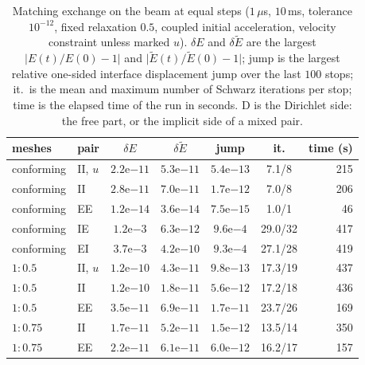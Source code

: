 \documentclass[11pt]{article}
\begin{document}
\begin{table}[htbp]
\centering
\footnotesize\setlength{\tabcolsep}{3pt}
\caption{Matching exchange on the beam at equal steps ($1\,\mu$s,
$10$\,ms, tolerance $10^{-12}$, fixed relaxation $0.5$, coupled initial
acceleration, velocity constraint unless marked $u$). $\delta E$ and
$\delta\tilde{E}$ are the largest $\lvert E(t)/E(0) - 1\rvert$ and
$\lvert \tilde{E}(t)/\tilde{E}(0) - 1\rvert$; jump is the largest relative
one-sided interface displacement jump over the last $100$ stops; it.\ is the mean and maximum
number of Schwarz iterations per stop; time is the elapsed time of the
run in seconds. D is the Dirichlet side: the free part, or the implicit
side of a mixed pair.}
\label{tab:equal}
\begin{tabular}{llccccr}
\toprule
meshes & pair & $\delta E$ & $\delta\tilde{E}$ & jump & it. & time (s) \\
\midrule
conforming & II, $u$ & $2.2\mathrm{e}{-11}$ & $5.3\mathrm{e}{-11}$ & $5.4\mathrm{e}{-13}$ & 7.1/8 & 215 \\
conforming & II & $2.8\mathrm{e}{-11}$ & $7.0\mathrm{e}{-11}$ & $1.7\mathrm{e}{-12}$ & 7.0/8 & 206 \\
conforming & EE & $1.2\mathrm{e}{-14}$ & $3.6\mathrm{e}{-14}$ & $7.5\mathrm{e}{-15}$ & 1.0/1 & 46 \\
conforming & IE & $1.2\mathrm{e}{-3}$ & $6.3\mathrm{e}{-12}$ & $9.6\mathrm{e}{-4}$ & 29.0/32 & 417 \\
conforming & EI & $3.7\mathrm{e}{-3}$ & $4.2\mathrm{e}{-10}$ & $9.3\mathrm{e}{-4}$ & 27.1/28 & 419 \\
$1{:}0.5$ & II, $u$ & $1.2\mathrm{e}{-10}$ & $4.3\mathrm{e}{-11}$ & $9.8\mathrm{e}{-13}$ & 17.3/19 & 437 \\
$1{:}0.5$ & II & $1.2\mathrm{e}{-10}$ & $1.8\mathrm{e}{-11}$ & $5.6\mathrm{e}{-12}$ & 17.2/18 & 436 \\
$1{:}0.5$ & EE & $3.5\mathrm{e}{-11}$ & $6.9\mathrm{e}{-11}$ & $1.7\mathrm{e}{-11}$ & 23.7/26 & 169 \\
$1{:}0.75$ & II & $1.7\mathrm{e}{-11}$ & $5.2\mathrm{e}{-11}$ & $1.5\mathrm{e}{-12}$ & 13.5/14 & 350 \\
$1{:}0.75$ & EE & $2.2\mathrm{e}{-11}$ & $6.1\mathrm{e}{-11}$ & $6.0\mathrm{e}{-12}$ & 16.2/17 & 157 \\
\bottomrule
\end{tabular}
\end{table}
\end{document}
